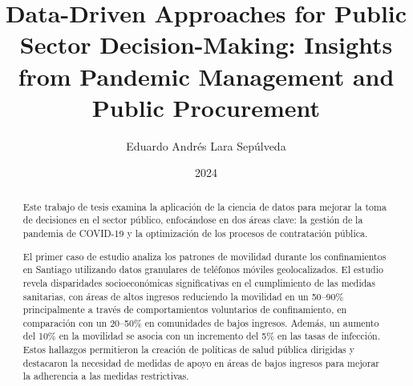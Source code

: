 \documentclass[upright, contnum]{umemoriaENG}
\author{Eduardo Andrés Lara Sepúlveda}
\title{Data-Driven Approaches for Public Sector Decision-Making: Insights from Pandemic Management and Public Procurement}
\date{2024}
\begin{document}
\frontmatter
\maketitle

\begin{abstract}





Este trabajo de tesis examina la aplicación de la ciencia de datos para mejorar la toma de decisiones en el sector público, enfocándose en dos áreas clave: la gestión de la pandemia de COVID-19 y la optimización de los procesos de contratación pública.

El primer caso de estudio analiza los patrones de movilidad durante los confinamientos en Santiago utilizando datos granulares de teléfonos móviles geolocalizados. El estudio revela disparidades socioeconómicas significativas en el cumplimiento de las medidas sanitarias, con áreas de altos ingresos reduciendo la movilidad en un 50–90\% principalmente a través de comportamientos voluntarios de confinamiento, en comparación con un 20–50\% en comunidades de bajos ingresos. Además, un aumento del 10\% en la movilidad se asocia con un incremento del 5\% en las tasas de infección. Estos hallazgos permitieron la creación de políticas de salud pública dirigidas y destacaron la necesidad de medidas de apoyo en áreas de bajos ingresos para mejorar la adherencia a las medidas restrictivas.


\end{abstract}
\end{document}
